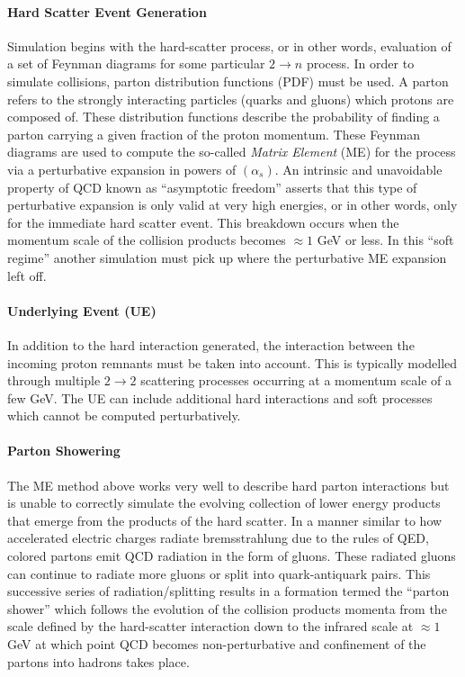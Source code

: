\paragraph{\textbf{Hard Scatter Event Generation}}
Simulation begins with the hard-scatter process, or in other words, evaluation of a set of Feynman diagrams for some particular $2 \rightarrow n$ process.
In order to simulate collisions, parton distribution functions (PDF) must be used.
A parton refers to the strongly interacting particles (quarks and gluons) which protons are composed of.
These distribution functions describe the probability of finding a parton carrying a given fraction of the proton momentum.
These Feynman diagrams are used to compute the so-called \textit{Matrix Element} (ME) for the process via a perturbative expansion in powers of $(\alpha_s)$.
An intrinsic and unavoidable property of QCD known as ``asymptotic freedom'' asserts that this type of perturbative expansion is only valid at very high energies, or in other words, only for the immediate hard scatter event.
This breakdown occurs when the momentum scale of the collision products becomes $\approx 1$ GeV or less.
In this ``soft regime'' another simulation must pick up where the perturbative ME expansion left off.

\paragraph{\textbf{Underlying Event (UE)}}
In addition to the hard interaction generated, the interaction between the incoming proton remnants must be taken into account.
This is typically modelled through multiple $2 \rightarrow 2$ scattering processes occurring at a momentum scale of a few GeV.
The UE can include additional hard interactions and soft processes which cannot be computed perturbatively.

\paragraph{\textbf{Parton Showering}}
The ME method above works very well to describe hard parton interactions but is unable to correctly simulate the evolving collection of lower energy products that emerge from the products of the hard scatter.
In a manner similar to how accelerated electric charges radiate bremsstrahlung due to the rules of QED, colored partons emit QCD radiation in the form of gluons.
These radiated gluons can continue to radiate more gluons or split into quark-antiquark pairs.
This successive series of radiation/splitting results in a formation termed the ``parton shower'' which follows the evolution of the collision products momenta from the scale defined by the hard-scatter interaction down to the infrared scale at $\approx 1$ GeV at which point QCD becomes non-perturbative and confinement of the partons into hadrons takes place.

